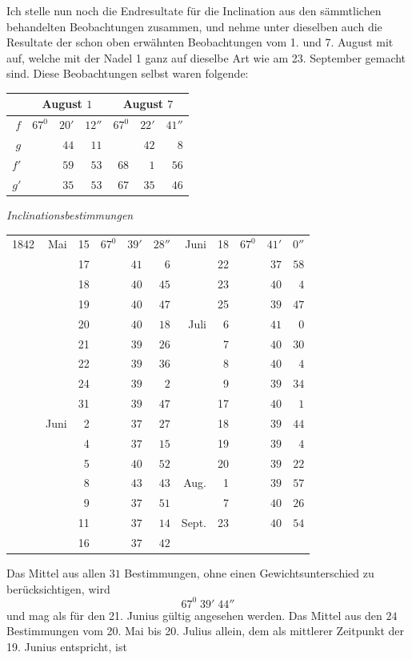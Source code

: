 Ich stelle nun noch die Endresultate für die Inclination aus den sämmtli\-chen behandelten Beobachtungen zusammen, und nehme unter dieselben auch die Resultate der schon oben erwähnten Beobachtungen vom 1. und 7. August mit auf, welche mit der Nadel 1 ganz auf dieselbe Art wie am 23. September gemacht sind. Diese Beobachtungen selbst waren folgende:
\begin{center}
\begin{tabular}{r||rrr||rrr}
&\multicolumn{3}{c||}{August $1$}&\multicolumn{3}{c}{August $7$}\\\hline
$f$&$67^0$&$20'$&$12''$&$67^0$&$22'$&$41''$\\
$g$&&$44$&$11$&&$42$&$8$\\
$f'$&&$59$&$53$&$68$&$1$&$56$\\
$g'$&&$35$&$53$&$67$&$35$&$46$
\end{tabular}
\end{center}
\begin{center}\textit{Inclinationsbestimmungen}

\begin{tabular}{rrr|rrr||rr|rrr}
1842&Mai&15&$67^0$&$39'$&$28''$&Juni&18&$67^0$&$41'$&$0''$\\
&&17&&$41$&$6$&&22&&$37$&$58$\\
&&18&&$40$&$45$&&23&&$40$&$4$\\
&&19&&$40$&$47$&&25&&$39$&$47$\\
&&20&&$40$&$18$&Juli&6&&$41$&$0$\\
&&21&&$39$&$26$&&7&&$40$&$30$\\
&&22&&$39$&$36$&&8&&$40$&$4$\\
&&24&&$39$&$2$&&9&&$39$&$34$\\
&&31&&$39$&$47$&&17&&$40$&$1$\\
&Juni&2&&$37$&$27$&&18&&$39$&$44$\\
&&4&&$37$&$15$&&19&&$39$&$4$\\
&&5&&$40$&$52$&&20&&$39$&$22$\\
&&8&&$43$&$43$&Aug.&1&&$39$&$57$\\
&&9&&$37$&$51$&&7&&$40$&$26$\\
&&11&&$37$&$14$&Sept.&23&&$40$&$54$\\
&&16&&$37$&$42$&&&&&
\end{tabular}
\end{center}
Das Mittel aus allen $31$ Bestimmungen, ohne einen Gewichtsunterschied zu berücksichtigen, wird
\[
67^0\;39'\;44''
\]
und mag als für den 21. Junius gültig angesehen werden. Das Mittel aus den $24$ Bestimmungen vom 20. Mai bis 20. Julius allein, dem als mittlerer Zeitpunkt der 19. Junius entspricht, ist
